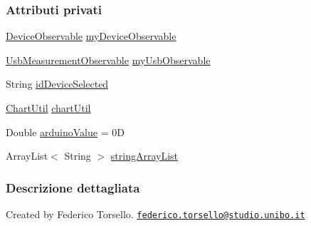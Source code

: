 \subsubsection*{Attributi privati}
\begin{DoxyCompactItemize}
\item 
\hyperlink{classit_1_1unibo_1_1torsello_1_1bluetoothpositioning_1_1observables_1_1DeviceObservable}{Device\+Observable} \hyperlink{classit_1_1unibo_1_1torsello_1_1bluetoothpositioning_1_1fragment_1_1devicesObservers_1_1DeviceChartFragment_a2c8de6418fffdb5affe4de22185b55eb_a2c8de6418fffdb5affe4de22185b55eb}{my\+Device\+Observable}
\item 
\hyperlink{classit_1_1unibo_1_1torsello_1_1bluetoothpositioning_1_1observables_1_1UsbMeasurementObservable}{Usb\+Measurement\+Observable} \hyperlink{classit_1_1unibo_1_1torsello_1_1bluetoothpositioning_1_1fragment_1_1devicesObservers_1_1DeviceChartFragment_a577dad67b3eabc0f48e95d08e9f5881b_a577dad67b3eabc0f48e95d08e9f5881b}{my\+Usb\+Observable}
\item 
String \hyperlink{classit_1_1unibo_1_1torsello_1_1bluetoothpositioning_1_1fragment_1_1devicesObservers_1_1DeviceChartFragment_aa117a620e8f8017f213be26e321d7084_aa117a620e8f8017f213be26e321d7084}{id\+Device\+Selected}
\item 
\hyperlink{classit_1_1unibo_1_1torsello_1_1bluetoothpositioning_1_1util_1_1ChartUtil}{Chart\+Util} \hyperlink{classit_1_1unibo_1_1torsello_1_1bluetoothpositioning_1_1fragment_1_1devicesObservers_1_1DeviceChartFragment_afe4ee0e5d07f3efb6887428c9ef04a2e_afe4ee0e5d07f3efb6887428c9ef04a2e}{chart\+Util}
\item 
Double \hyperlink{classit_1_1unibo_1_1torsello_1_1bluetoothpositioning_1_1fragment_1_1devicesObservers_1_1DeviceChartFragment_a913e9b39a11d361793d7884bd2ddfd4c_a913e9b39a11d361793d7884bd2ddfd4c}{arduino\+Value} = 0D
\item 
Array\+List$<$ String $>$ \hyperlink{classit_1_1unibo_1_1torsello_1_1bluetoothpositioning_1_1fragment_1_1devicesObservers_1_1DeviceChartFragment_a7bff8d8b328464c2add8d6664c149cb5_a7bff8d8b328464c2add8d6664c149cb5}{string\+Array\+List}
\end{DoxyCompactItemize}


\subsubsection{Descrizione dettagliata}
Created by Federico Torsello. \href{mailto:federico.torsello@studio.unibo.it}{\tt federico.\+torsello@studio.\+unibo.\+it} 

